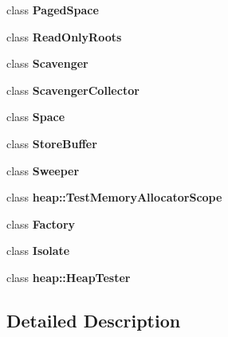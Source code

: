 \begin{DoxyCompactItemize}
class {\bfseries Paged\+Space}
\item 
\mbox{\label{classv8_1_1internal_1_1Heap_a723b2cfa707c63382946bbf0be13d9ec}} 
class {\bfseries Read\+Only\+Roots}
\item 
\mbox{\label{classv8_1_1internal_1_1Heap_a69194b9c6def4e9ec4e2c07b61f7f5a3}} 
class {\bfseries Scavenger}
\item 
\mbox{\label{classv8_1_1internal_1_1Heap_aa44b0c41f5588ce61c1f725ff6693d4c}} 
class {\bfseries Scavenger\+Collector}
\item 
\mbox{\label{classv8_1_1internal_1_1Heap_a2129e6c0ac73536a2ac4f681dae16947}} 
class {\bfseries Space}
\item 
\mbox{\label{classv8_1_1internal_1_1Heap_af53b41f2b174f4a360658c2f08e20975}} 
class {\bfseries Store\+Buffer}
\item 
\mbox{\label{classv8_1_1internal_1_1Heap_a3e6d5ea37acc2b6bc3570f5a413ec0ac}} 
class {\bfseries Sweeper}
\item 
\mbox{\label{classv8_1_1internal_1_1Heap_a857e1ab05c913c4e528b0d35ad7a7916}} 
class {\bfseries heap\+::\+Test\+Memory\+Allocator\+Scope}
\item 
\mbox{\label{classv8_1_1internal_1_1Heap_a328c093d609680cca505905c6d49901a}} 
class {\bfseries Factory}
\item 
\mbox{\label{classv8_1_1internal_1_1Heap_aba4f0964bdacf2bbf62cf876e5d28d0a}} 
class {\bfseries Isolate}
\item 
\mbox{\label{classv8_1_1internal_1_1Heap_a82ae4496cd3d64eb51e343ce3dcda96f}} 
class {\bfseries heap\+::\+Heap\+Tester}
\end{DoxyCompactItemize}


\subsection{Detailed Description}


